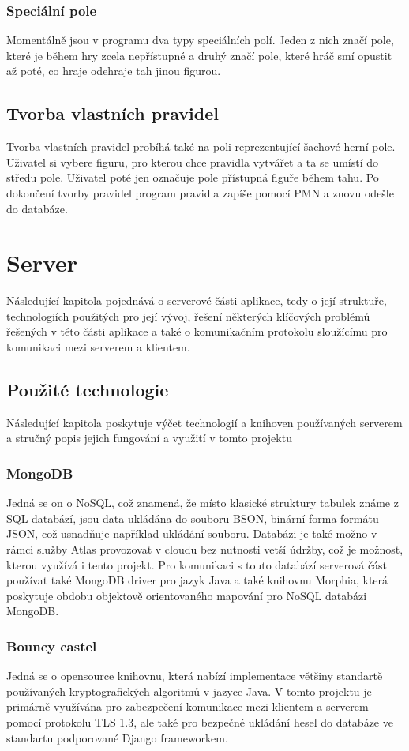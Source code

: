 \documentclass[12pt]{article}
\begin{document}
\subsubsection{Speciální pole}
Momentálně jsou v programu dva typy speciálních polí. Jeden z nich značí pole, které je během hry zcela nepřístupné a druhý značí pole, které hráč smí opustit až poté, co hraje odehraje tah jinou figurou.
\subsection{Tvorba vlastních pravidel}
Tvorba vlastních pravidel probíhá také na poli reprezentující šachové herní pole. Uživatel si vybere figuru, pro kterou chce pravidla vytvářet a ta se umístí do středu pole. Uživatel poté jen označuje pole přístupná figuře během tahu. Po dokončení tvorby pravidel program pravidla zapíše pomocí PMN\cite{Parlett's movement notation} a znovu odešle do databáze.
\newpage
\section{Server}
Následující kapitola pojednává o serverové části aplikace, tedy o její struktuře, technologiích použitých pro její vývoj, řešení některých klíčových problémů řešených v této části aplikace a také o komunikačním protokolu sloužícímu pro komunikaci mezi serverem a klientem.
\subsection{Použité technologie}
Následující kapitola poskytuje výčet technologií a knihoven používaných serverem a stručný popis jejich fungování a využití v tomto projektu
\subsubsection{MongoDB}
Jedná se on o NoSQL, což znamená, že místo klasické struktury tabulek známe z SQL databází, jsou data ukládána do souboru BSON, binární forma formátu JSON, což usnadňuje například ukládání souboru. Databázi je také možno v rámci služby Atlas provozovat v cloudu bez nutnosti vetší údržby, což je možnost, kterou využívá i tento projekt. Pro komunikaci s touto databází serverová část používat také MongoDB driver pro jazyk Java a také knihovnu Morphia, která poskytuje obdobu objektově orientovaného mapování pro NoSQL databázi MongoDB.
\subsubsection{Bouncy castel}
Jedná se o opensource knihovnu, která nabízí implementace většiny standartě používaných kryptografických algoritmů v jazyce Java\cite{bouncyCastle}. V tomto projektu je primárně využívána pro zabezpečení komunikace mezi klientem a serverem pomocí protokolu TLS 1.3, ale také pro bezpečné ukládání hesel do databáze ve standartu podporované Django frameworkem.
\end{document}
